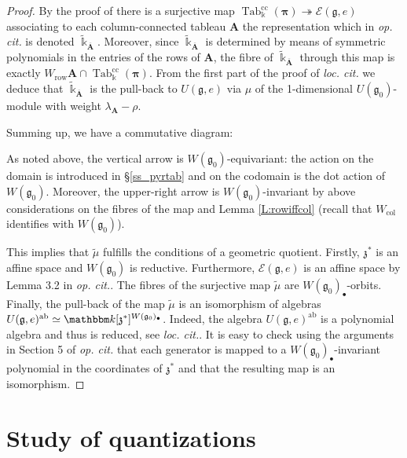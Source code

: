 \documentclass[twoside,12pt,reqno]{amsart}
\theoremstyle{remark}
\numberwithin{equation}{section}
\def\bar{\overline}
\def\onto{\twoheadrightarrow}
\def\k{{\mathbbm k}}
\newcommand{\Tab}{\operatorname{Tab}}
\def\cc{{\operatorname{cc}}}
\def\ab{{\operatorname{ab}}}
\def\col{\operatorname{col}}
\def\col{\operatorname{col}}
\def\row{\operatorname{row}}
\def\bA{{\bm{A}}}
\def\bpi{{\bm{\pi}}}
\def\g{{\mathfrak g}}
\def\z{\mathfrak{z}}
\def\E{\mathcal{E}}
\begin{document}
\begin{proof}
By the proof of \cite[Theorem 5.1]{GT}
 there is a surjective map $\Tab^{\cc}_\Bbbk(\bpi) \onto \E(\g, e)$ associating to each  column-connected tableau $\bA$  the representation which in  \emph{op. cit.} is denoted $\widetilde{\Bbbk}_{\bar \bA}$.
 Moreover, since  $\widetilde{\Bbbk}_{\bar \bA}$ is determined by means of symmetric polynomials in the entries of the rows of $\bA$, the fibre of $\widetilde{\Bbbk}_{\bar \bA}$ through this map is exactly $W_{\row} \bA \cap \Tab^{\cc}_\Bbbk(\bpi)$.
From  the first part of the proof of \emph{loc. cit.} we deduce  that $\widetilde{\Bbbk}_{\bar \bA}$ is the pull-back to $U(\g, e)$ via $\mu$ of the 1-dimensional $U(\g_0)$-module with weight $\lambda_\bA - \rho$.
 
Summing up, we have a commutative diagram:
\begin{center}
\end{center}
As noted above, the vertical arrow is $W(\g_0)$-equivariant: the action on the domain is introduced in §\ref{ss_pyrtab} and on the codomain is the dot action of $W(\g_0)$.
Moreover, the upper-right arrow is $W(\g_0)$-invariant by above considerations on the fibres of the map and Lemma \ref{L:rowiffcol} (recall that $W_{\col}$ identifies with $W(\g_0)$).

This implies that $\tilde \mu$ fulfills the conditions of a geometric quotient. Firstly, $\z^*$ is an affine space and $W(\g_0)$ is reductive. Furthermore, $\E(\g,e)$ is an affine space by Lemma 3.2 in \emph{op. cit.}. The fibres of the surjective map $\tilde \mu$ are $W(\g_0)_\bullet$-orbits. Finally, the pull-back of the map $\tilde \mu$ is an isomorphism of algebras $U(\g,e)^{\ab} \simeq \k[\z^*]^{W(\g_0)_\bullet}$. Indeed, the algebra $U(\g,e)^{\ab}$ is a polynomial algebra and thus is reduced, see \emph{loc. cit.}. It is easy to check using the arguments in Section 5 of \emph{op. cit.} that each generator is mapped to a ${W(\g_0)_\bullet}$-invariant polynomial in the coordinates of $\z^*$ and that the resulting map is an isomorphism.
\end{proof}


\section{Study of quantizations}\label{s:Quants}
\end{document}
